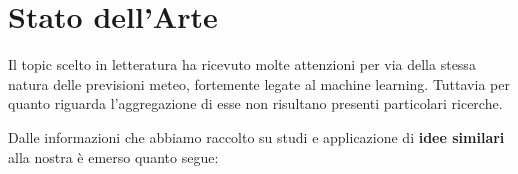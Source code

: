 

\chapter{Stato dell'Arte}
Il topic scelto in letteratura ha ricevuto molte attenzioni per via della stessa natura delle previsioni meteo, fortemente legate al machine learning. Tuttavia per quanto riguarda l'aggregazione di esse non risultano presenti particolari ricerche.
\par Dalle informazioni che abbiamo raccolto su studi e applicazione di \textbf{idee similari} alla nostra è emerso quanto segue:

